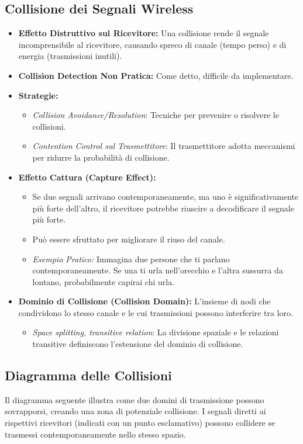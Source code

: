 \documentclass{article}
\begin{document}
\subsection{Collisione dei Segnali Wireless}
\begin{itemize}
    \item \textbf{Effetto Distruttivo sul Ricevitore:} Una collisione rende il segnale incomprensibile al ricevitore, causando spreco di canale (tempo perso) e di energia (trasmissioni inutili).
    \item \textbf{Collision Detection Non Pratica:} Come detto, difficile da implementare.
    \item \textbf{Strategie:}
    \begin{itemize}
        \item \textit{Collision Avoidance/Resolution}: Tecniche per prevenire o risolvere le collisioni.
        \item \textit{Contention Control sul Trasmettitore}: Il trasmettitore adotta meccanismi per ridurre la probabilità di collisione.
    \end{itemize}
    \item \textbf{Effetto Cattura (Capture Effect):}
    \begin{itemize}
        \item Se due segnali arrivano contemporaneamente, ma uno è significativamente più forte dell'altro, il ricevitore potrebbe riuscire a decodificare il segnale più forte.
        \item Può essere sfruttato per migliorare il riuso del canale.
        \item \textit{Esempio Pratico:} Immagina due persone che ti parlano contemporaneamente. Se una ti urla nell'orecchio e l'altra sussurra da lontano, probabilmente capirai chi urla.
    \end{itemize}
    \item \textbf{Dominio di Collisione (Collision Domain):} L'insieme di nodi che condividono lo stesso canale e le cui trasmissioni possono interferire tra loro.
    \begin{itemize}
        \item \textit{Space splitting, transitive relation}: La divisione spaziale e le relazioni transitive definiscono l'estensione del dominio di collisione.
    \end{itemize}
\end{itemize}

\subsection{Diagramma delle Collisioni}
Il diagramma seguente illustra come due domini di trasmissione possono sovrapporsi, creando una zona di potenziale collisione. I segnali diretti ai rispettivi ricevitori (indicati con un punto esclamativo) possono collidere se trasmessi contemporaneamente nello stesso spazio.
\end{document}
